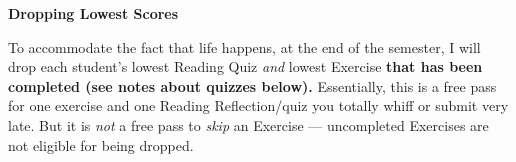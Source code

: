 \documentclass[12pt]{article}
\begin{document}
\textbf{Dropping Lowest Scores}

To accommodate the fact that life happens, at the end of the semester, I will drop each student's lowest Reading Quiz \emph{and} lowest Exercise \textbf{that has been completed (see notes about quizzes below).} Essentially, this is a free pass for one exercise and one Reading Reflection/quiz you totally whiff or submit very late. But it is \emph{not} a free pass to \emph{skip} an Exercise — uncompleted Exercises are not eligible for being dropped.


%
%
%
%

\end{document}
